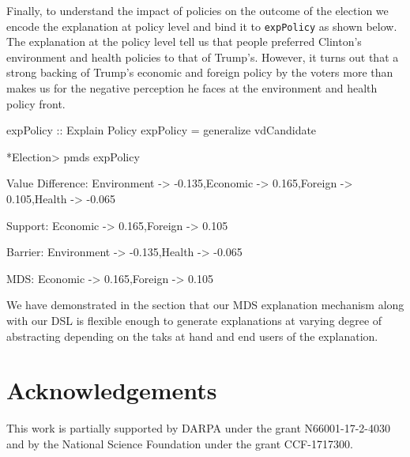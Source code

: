 \documentclass{jfp}
\newcommand{\prog}[1]{\texttt{#1}}
\begin{document}
Finally, to understand the impact of policies on the outcome of the election we encode the explanation at policy level and bind it to \prog{expPolicy} as shown below. The explanation at the policy level tell us that people preferred Clinton's environment and health policies to that of Trump's. However, it turns out that a strong backing of Trump's economic and foreign policy by the voters more than makes us for the negative perception he faces at the environment and health policy front. 
\begin{haskellcode}
expPolicy :: Explain Policy
expPolicy = generalize vdCandidate 

*Election> pmds expPolicy

Value Difference:
{Environment -> -0.135,Economic -> 0.165,Foreign -> 0.105,Health -> -0.065}

Support:
{Economic -> 0.165,Foreign -> 0.105}

Barrier:
{Environment -> -0.135,Health -> -0.065}

MDS:
{Economic -> 0.165,Foreign -> 0.105}
\end{haskellcode}

We have demonstrated in the section that our MDS explanation mechanism along with our DSL is flexible enough to generate explanations at varying degree of abstracting depending on the taks at hand and end users of the explanation. 

\section*{Acknowledgements}
This work is partially supported by DARPA under the grant N66001-17-2-4030 and by the National Science Foundation under the grant CCF-1717300.

% 
% 

\label{lastpage}
\end{document}

